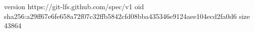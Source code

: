 version https://git-lfs.github.com/spec/v1
oid sha256:a29ff67e6fe658a72f07c32ffb5842cfd08bba435346e9124aee104ecd2fa0d6
size 43864
